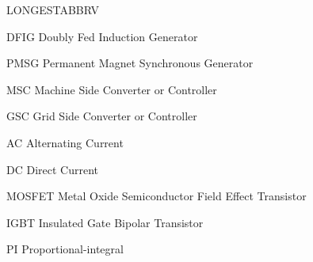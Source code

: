\begin{theglossary}{LONGESTABBRV}
\item[DFIG] Doubly Fed Induction Generator
\item[PMSG] Permanent Magnet Synchronous Generator
\item[MSC] Machine Side Converter or Controller
\item[GSC] Grid Side Converter or Controller
\item[AC] Alternating Current
\item[DC] Direct Current
\item[MOSFET] Metal Oxide Semiconductor Field Effect Transistor
\item[IGBT] Insulated Gate Bipolar Transistor
\item[PI] Proportional-integral

\end{theglossary}
